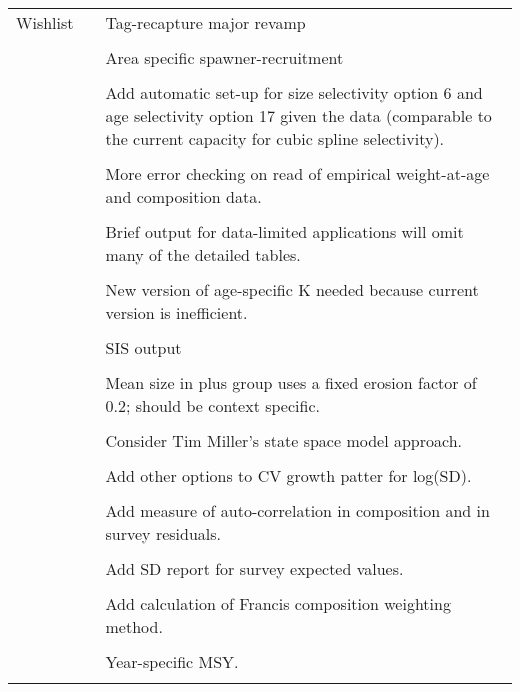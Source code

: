 \begin{center}
\begin{longtable}{p{2cm} p{3cm} p{10cm}}
		\hline
		Wishlist & &
			 Tag-recapture major revamp\\\\
	     & & Area specific spawner-recruitment \\\\
	     & & Add automatic set-up for size selectivity option 6 and age selectivity option 17 given the data (comparable to the current capacity for cubic spline selectivity).\\\\
	     & & More error checking on read of empirical weight-at-age and composition data. \\\\
	     & & Brief output for data-limited applications will omit many of the detailed tables.\\\\
	     & & New version of age-specific K needed because current version is inefficient.\\\\
	     & & SIS output\\\\
	     & & Mean size in plus group uses a fixed erosion factor of 0.2; should be context specific. \\\\
	     & & Consider Tim Miller's state space model approach. \\\\
	     & & Add other options to CV growth patter for log(SD). \\\\
	     & & Add measure of auto-correlation in composition and in survey residuals.\\\\
	     & & Add SD report for survey expected values. \\\\
	     & & Add calculation of Francis composition weighting method. \\\\
	     & & Year-specific MSY.\\	     	   \\	  	  				
		\hline
	\end{longtable}
\end{center}

